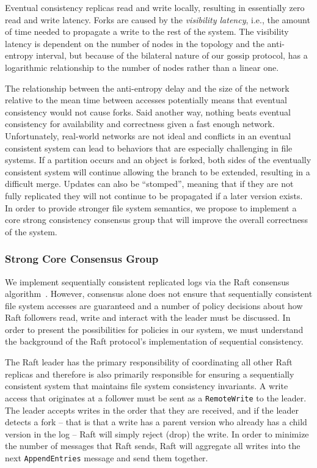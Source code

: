 \documentclass{article}
\begin{document}
Eventual consistency replicas read and write locally, resulting in essentially zero read and write latency. Forks are caused by the \textit{visibility latency}, i.e., the amount of time needed to propagate a write to the rest of the system. The visibility latency is dependent on the number of nodes in the topology and the anti-entropy interval, but because of the bilateral nature of our gossip protocol, has a logarithmic relationship to the number of nodes rather than a linear one.

The relationship between the anti-entropy delay and the size of the network relative to the mean time between accesses potentially means that eventual consistency would not cause forks. Said another way, nothing beats eventual consistency for availability and correctness given a fast enough network. Unfortunately, real-world networks are not ideal and conflicts in an eventual consistent system can lead to behaviors that are especially challenging in file systems. If a partition occurs and an object is forked, both sides of the eventually consistent system will continue allowing the branch to be extended, resulting in a difficult merge. Updates can also be ``stomped'', meaning that if they are not fully replicated they will not continue to be propagated if a later version exists. In order to provide stronger file system semantics, we propose to implement a core strong consistency consensus group that will improve the overall correctness of the system.

\subsubsection{Strong Core Consensus Group}
\label{sec:core_consensus}

We implement sequentially consistent replicated logs via the Raft consensus algorithm~\cite{ongaro_search_2014}. However, consensus alone does not ensure that sequentially consistent file system accesses are guaranteed and a number of policy decisions about how Raft followers read, write and interact with the leader must be discussed. In order to present the possibilities for policies in our system, we must understand the background of the Raft protocol's implementation of sequential consistency.

The Raft leader has the primary responsibility of coordinating all other Raft replicas and therefore is also primarily responsible for ensuring a sequentially consistent system that maintains file system consistency invariants. A write access that originates at a follower must be sent as a \texttt{RemoteWrite} to the leader. The leader accepts writes in the order that they are received, and if the leader detects a fork -- that is that a write has a parent version who already has a child version in the log -- Raft will simply reject (drop) the write. In order to minimize the number of messages that Raft sends, Raft will aggregate all writes into the next \texttt{AppendEntries} message and send them together.
\end{document}
